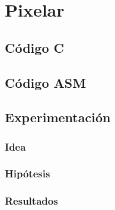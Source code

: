 \section{Pixelar}

\subsection{Código C}
	
\subsection{Código ASM}
	
	
	
\subsection{Experimentación}
\subsubsection{Idea}	

\subsubsection{Hipótesis}
	
	
\subsubsection{Resultados}
	